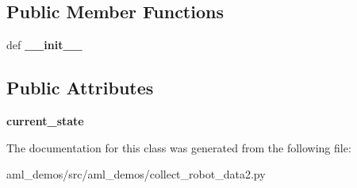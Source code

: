 \subsection*{Public Member Functions}
\begin{DoxyCompactItemize}
\item 
\hypertarget{classaml__demos_1_1collect__robot__data2_1_1_agent_proxy_a83a1fd26c8a38526a7d2aa98a89f8f30}{def {\bfseries \-\_\-\-\_\-init\-\_\-\-\_\-}}\label{classaml__demos_1_1collect__robot__data2_1_1_agent_proxy_a83a1fd26c8a38526a7d2aa98a89f8f30}

\end{DoxyCompactItemize}
\subsection*{Public Attributes}
\begin{DoxyCompactItemize}
\item 
\hypertarget{classaml__demos_1_1collect__robot__data2_1_1_agent_proxy_a123eb36a6e52fd468eb1ff40e876c191}{{\bfseries current\-\_\-state}}\label{classaml__demos_1_1collect__robot__data2_1_1_agent_proxy_a123eb36a6e52fd468eb1ff40e876c191}

\end{DoxyCompactItemize}


The documentation for this class was generated from the following file\-:\begin{DoxyCompactItemize}
\item 
aml\-\_\-demos/src/aml\-\_\-demos/collect\-\_\-robot\-\_\-data2.\-py\end{DoxyCompactItemize}
